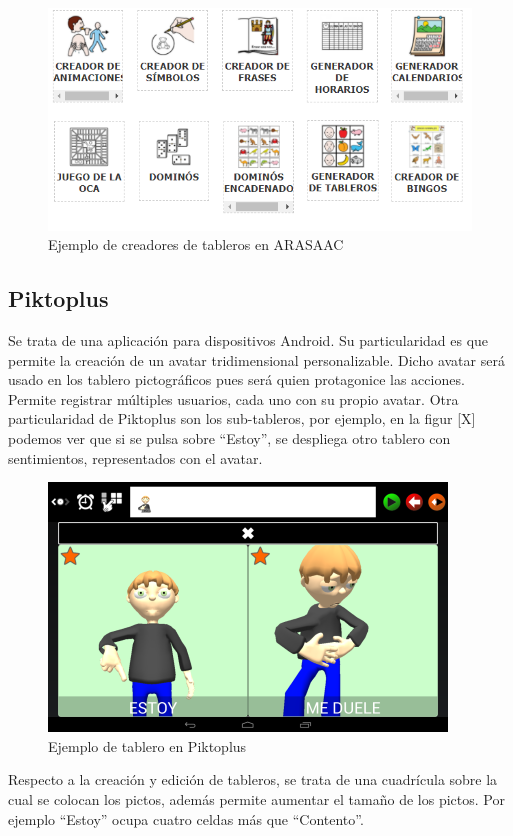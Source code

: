\begin{figure}[h!]
	\centering
	\includegraphics[width=0.7\linewidth]{Imagenes/Bitmap/Tableros ARASAAC}
	\caption[Tableros web ARASAAC]{Ejemplo de creadores de tableros en ARASAAC}
	\label{fig:tableros-arasaac}
\end{figure}


\subsection{Piktoplus}
Se trata de una aplicación para dispositivos Android. Su particularidad es que permite la creación de un avatar tridimensional personalizable. Dicho avatar será usado en los tablero pictográficos pues será quien protagonice las acciones. Permite registrar múltiples usuarios, cada uno con su propio avatar. Otra particularidad de Piktoplus son los sub-tableros, por ejemplo, en la figur [X] podemos ver que si se pulsa sobre “Estoy”, se despliega otro tablero con sentimientos, representados con el avatar.

\begin{figure}[h!]
	\centering
	\includegraphics[width=0.7\linewidth]{Imagenes/Bitmap/Piktoplus1}
	\caption[Pictoplus tablero]{Ejemplo de tablero en Piktoplus}
	\label{fig:piktoplus1}
\end{figure}



Respecto a la creación y edición de tableros, se trata de una cuadrícula sobre la cual se colocan los pictos, además permite aumentar el tamaño de los pictos. Por ejemplo “Estoy” ocupa cuatro celdas más que “Contento”.

